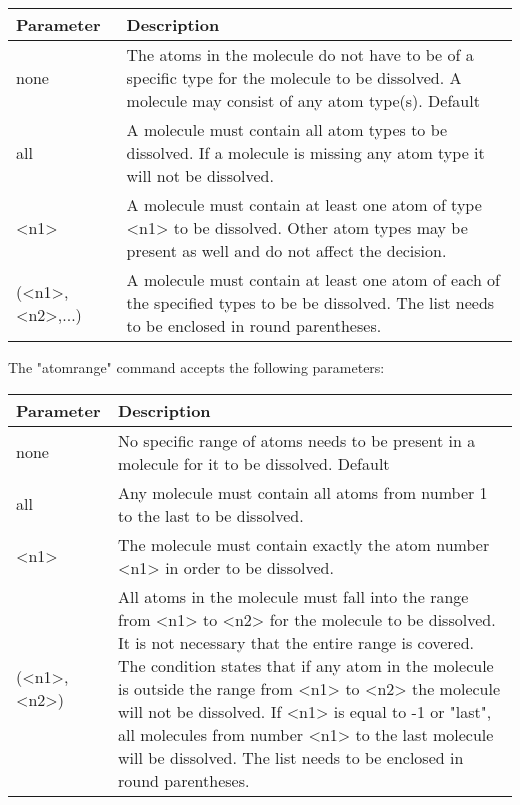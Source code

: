 \begin{tabularx}{\textwidth}{|p{30mm}|X|}
  \hline
  {\bf Parameter} & {\bf Description} \\
  \hline\hline
  none    & The atoms in the molecule do not have to be of a specific type for
            the molecule to be dissolved. A molecule may consist of any atom 
            type(s). Default\\
  all     & A molecule must contain all atom types to be dissolved. If a 
            molecule is missing any atom type it will not be dissolved. \\
  <n1>    & A molecule must contain at least one atom of type <n1> to be 
            dissolved. Other atom types may be present as well and do not affect
            the decision. \\
  (<n1>,<n2>{,...})    & A molecule must contain at least one atom of each of 
                         the specified types to be be dissolved. The list needs
                         to be enclosed in round parentheses.\\
  \hline
\end{tabularx}

The "atomrange" command accepts the following parameters:

\begin{tabularx}{\textwidth}{|p{30mm}|X|}
  \hline
  {\bf Parameter} & {\bf Description} \\
  \hline\hline
  none    & No specific range of atoms needs to be present in a molecule for 
            it to be dissolved. Default\\
  all     & Any molecule must contain all atoms from number 1 to the last to be 
            dissolved. \\
  <n1>    & The molecule must contain exactly the atom number <n1> in order to 
            be dissolved.\\
  (<n1>,<n2>)    & All atoms in the molecule must fall into the range from <n1> 
                   to <n2> for the molecule to be dissolved. It is not necessary
                   that the entire range is covered. The condition states that 
                   if any atom in the molecule is outside the range from <n1> 
                   to <n2> the molecule will not be dissolved. If <n1> is equal 
                   to -1 or "last", all molecules from number <n1> to the 
                   last molecule will be dissolved. The list needs to be 
                   enclosed in round parentheses.\\
  \hline
\end{tabularx}

